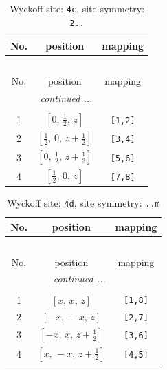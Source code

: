 \documentclass[fleqn,8pt]{jsarticle}
\begin{document}
\renewcommand{\arraystretch}{1.2}
\begin{longtable}{ccc}
\caption{Wyckoff site: {\tt 4c}, site symmetry: {\tt 2..}}
 \\
 \hline \hline
No. & position & mapping \\ \hline \endfirsthead

\multicolumn{2}{l}{\tablename\ \thetable{}} \\
 \hline \hline
No. & position & mapping \\ \hline \endhead

 \hline \hline
\multicolumn{2}{r}{\footnotesize\it continued ...} \\ \endfoot

 \hline \hline
\multicolumn{2}{r}{} \\ \endlastfoot

1 & $\left[ 0,\, \frac{1}{2},\, z \right]$ & {\tt [1,2]} \\ \hline
2 & $\left[ \frac{1}{2},\, 0,\, z + \frac{1}{2} \right]$ & {\tt [3,4]} \\ \hline
3 & $\left[ 0,\, \frac{1}{2},\, z + \frac{1}{2} \right]$ & {\tt [5,6]} \\ \hline
4 & $\left[ \frac{1}{2},\, 0,\, z \right]$ & {\tt [7,8]} \\
\end{longtable}
\renewcommand{\arraystretch}{1.2}
\begin{longtable}{ccc}
\caption{Wyckoff site: {\tt 4d}, site symmetry: {\tt ..m}}
 \\
 \hline \hline
No. & position & mapping \\ \hline \endfirsthead

\multicolumn{2}{l}{\tablename\ \thetable{}} \\
 \hline \hline
No. & position & mapping \\ \hline \endhead

 \hline \hline
\multicolumn{2}{r}{\footnotesize\it continued ...} \\ \endfoot

 \hline \hline
\multicolumn{2}{r}{} \\ \endlastfoot

1 & $\left[ x,\, x,\, z \right]$ & {\tt [1,8]} \\ \hline
2 & $\left[ - x,\, - x,\, z \right]$ & {\tt [2,7]} \\ \hline
3 & $\left[ - x,\, x,\, z + \frac{1}{2} \right]$ & {\tt [3,6]} \\ \hline
4 & $\left[ x,\, - x,\, z + \frac{1}{2} \right]$ & {\tt [4,5]} \\
\end{longtable}
\end{document}
